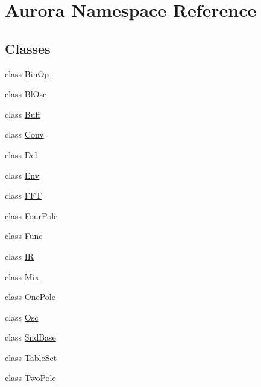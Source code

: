 \hypertarget{namespace_aurora}{}\section{Aurora Namespace Reference}
\label{namespace_aurora}
\subsection*{Classes}
\begin{DoxyCompactItemize}
\item 
class \hyperlink{class_aurora_1_1_bin_op}{Bin\+Op}
\item 
class \hyperlink{class_aurora_1_1_bl_osc}{Bl\+Osc}
\item 
class \hyperlink{class_aurora_1_1_buff}{Buff}
\item 
class \hyperlink{class_aurora_1_1_conv}{Conv}
\item 
class \hyperlink{class_aurora_1_1_del}{Del}
\item 
class \hyperlink{class_aurora_1_1_env}{Env}
\item 
class \hyperlink{class_aurora_1_1_f_f_t}{F\+FT}
\item 
class \hyperlink{class_aurora_1_1_four_pole}{Four\+Pole}
\item 
class \hyperlink{class_aurora_1_1_func}{Func}
\item 
class \hyperlink{class_aurora_1_1_i_r}{IR}
\item 
class \hyperlink{class_aurora_1_1_mix}{Mix}
\item 
class \hyperlink{class_aurora_1_1_one_pole}{One\+Pole}
\item 
class \hyperlink{class_aurora_1_1_osc}{Osc}
\item 
class \hyperlink{class_aurora_1_1_snd_base}{Snd\+Base}
\item 
class \hyperlink{class_aurora_1_1_table_set}{Table\+Set}
\item 
class \hyperlink{class_aurora_1_1_two_pole}{Two\+Pole}
\end{DoxyCompactItemize}

